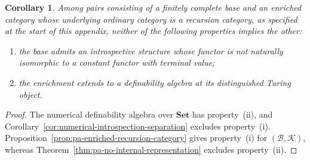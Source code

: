 \documentclass[11pt]{article}
\newtheorem{corollary}[theorem]{Corollary}
\theoremstyle{definition}
\theoremstyle{remark}
\begin{document}
\begin{corollary}\label{cor:fixed-base-incomparability}
Among pairs consisting of a finitely complete base and an enriched
category whose underlying ordinary category is a recursion category,
as specified at the start of this appendix,
neither of the following properties implies the other:
\begin{enumerate}[label=\textup{(\roman*)}]
\item the base admits an introspective structure whose functor
is not naturally isomorphic to a constant functor with terminal value;
\item the enrichment extends to a definability algebra at its
distinguished Turing object.
\end{enumerate}
\end{corollary}
\begin{proof}
The numerical definability algebra over $\mathbf{Set}$ has
property~\textup{(ii)}, and
Corollary~\ref{cor:numerical-introspection-separation} excludes
property~\textup{(i)}.
Proposition~\ref{prop:pa-enriched-recursion-category} gives
property~\textup{(i)} for $(\mathcal B,\mathcal K)$, whereas
Theorem~\ref{thm:pa-no-internal-representation} excludes
property~\textup{(ii)}.
\end{proof}
\end{document}
